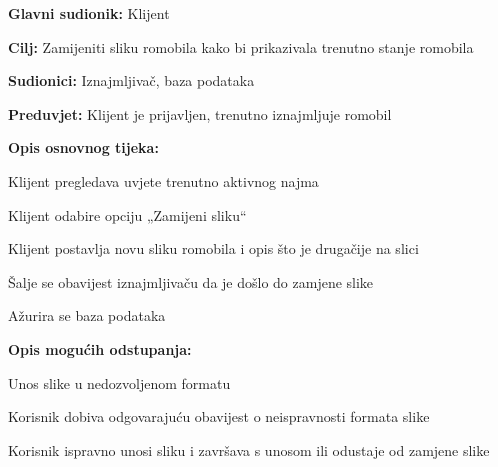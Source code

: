 						\begin{packed_item}
							
							\item \textbf{Glavni sudionik: }Klijent
							\item  \textbf{Cilj: }Zamijeniti sliku romobila kako bi prikazivala trenutno stanje romobila
							\item  \textbf{Sudionici: }Iznajmljivač, baza podataka
							\item  \textbf{Preduvjet: }Klijent je prijavljen, trenutno iznajmljuje romobil
							\item  \textbf{Opis osnovnog tijeka:}
							
							\item[] \begin{packed_enum}
								\item Klijent pregledava uvjete trenutno aktivnog najma
								\item Klijent odabire opciju „Zamijeni sliku“ 
								\item Klijent postavlja novu sliku romobila i opis što je drugačije na slici 
								\item Šalje se obavijest iznajmljivaču da je došlo do zamjene slike   
								\item Ažurira se baza podataka
							\end{packed_enum}
							
							\item  \textbf{Opis mogućih odstupanja:}
							
							\item[] \begin{packed_item}
								
								\item[3.a] Unos slike u nedozvoljenom formatu 
								\item[] \begin{packed_enum}
									
									\item Korisnik dobiva odgovarajuću obavijest o neispravnosti formata slike 
									\item Korisnik ispravno unosi sliku i završava s unosom ili odustaje od zamjene slike 
									
								\end{packed_enum}		
							\end{packed_item}
						\end{packed_item}
						\noindent {}
